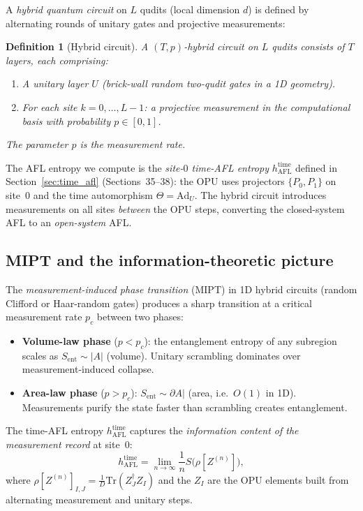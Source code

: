 \documentclass[12pt,a4paper]{article}
\newtheorem{definition}[theorem]{Definition}
\begin{document}
A \emph{hybrid quantum circuit} on $L$ qudits (local dimension $d$) is
defined by alternating rounds of unitary gates and projective measurements:

\begin{definition}[Hybrid circuit]\label{def:hybrid}
A $(T,p)$-hybrid circuit on $L$ qudits consists of $T$ layers, each
comprising:
\begin{enumerate}
\item A \emph{unitary layer} $U$ (brick-wall random two-qudit gates in a
  1D geometry).
\item For each site $k=0,\ldots,L-1$: a projective measurement in the
  computational basis with probability $p\in[0,1]$.
\end{enumerate}
The parameter $p$ is the \emph{measurement rate}.
\end{definition}

The AFL entropy we compute is the \emph{site-$0$ time-AFL entropy}
$h_{\mathrm{AFL}}^{\mathrm{time}}$ defined in Section~\ref{sec:time_afl}
(Sections~35--38): the OPU uses projectors $\{P_0,P_1\}$ on site~$0$ and
the time automorphism $\Theta = \mathrm{Ad}_U$.  The hybrid circuit
introduces measurements on all sites \emph{between} the OPU steps,
converting the closed-system AFL to an \emph{open-system} AFL.

\subsection{MIPT and the information-theoretic picture}

The \emph{measurement-induced phase transition} (MIPT) \cite{skinner2019}
in 1D hybrid circuits (random Clifford or Haar-random gates) produces a
sharp transition at a critical measurement rate $p_c$ between two phases:
\begin{itemize}
\item \textbf{Volume-law phase} ($p < p_c$): the entanglement entropy of
  any subregion scales as $S_{\mathrm{ent}} \sim |A|$ (volume).  Unitary
  scrambling dominates over measurement-induced collapse.
\item \textbf{Area-law phase} ($p > p_c$): $S_{\mathrm{ent}} \sim \partial A|$
  (area, i.e.\ $O(1)$ in 1D).  Measurements purify the state faster than
  scrambling creates entanglement.
\end{itemize}

The time-AFL entropy $h_{\mathrm{AFL}}^{\mathrm{time}}$ captures the
\emph{information content of the measurement record} at site~$0$:
\[
  h_{\mathrm{AFL}}^{\mathrm{time}}
  = \lim_{n\to\infty}\frac{1}{n}S\!\bigl(\rho[Z^{(n)}]\bigr),
\]
where $\rho[Z^{(n)}]_{I,J} = \tfrac{1}{D}\mathrm{Tr}(Z_J^\dagger Z_I)$ and
the $Z_I$ are the OPU elements built from alternating measurement and
unitary steps.
\end{document}
